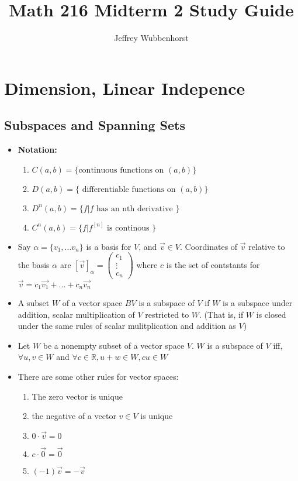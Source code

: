 \documentclass[10pt,letterpaper]{article}
\author{Jeffrey Wubbenhorst}
\title{Math 216 Midterm 2 Study Guide }
\begin{document}
\maketitle

\section*{Dimension, Linear Indepence} 
\subsection*{Subspaces and Spanning Sets }%
\begin{itemize}

\item \textbf{Notation: }
\begin{enumerate}
\item $C(a,b)=\{\mbox{continuous functions on } (a,b)\}$
\item $D(a,b)=\{\mbox{ differentiable functions on } (a,b)\}$ 
\item $D^n(a,b)=\{f | f\mbox{ has an nth derivative }\}$ 
\item $C^n(a,b) = \{f|f^{[n]}\mbox{ is continous }\}$
\end{enumerate}

\item Say $\alpha=\{v_1,...v_n\}$ is a basis for $V$, and $\vec{v}\in V$. Coordinates of $\vec{v}$ relative to the basis $\alpha$ are $[\vec{v}]_\alpha=\left(
\begin{array}{c} 
c_1 \\ \vdots \\ c_n
\end{array} \right)
$
where $c$ is the set of contstants for $\vec{v}=c_1\vec{v_1}+...+c_n\vec{v_n}$


\item A subset $W$ of a vector space $BV$ is a subspace of $V$ if $W$ is a subspace under addition, scalar multiplication of $V$ restricted to  $W$. (That is, if $W$ is closed under the same rules of scalar mulitplication and addition as $V$)

\item Let $W$ be a nonempty subset of a vector space $V$. $W$ is a subspace of $V$ iff, $\forall u, v \in W$ and $\forall c \in \mathbb{R}, u + w \in W, cu \in W$

\item There are some other rules for vector spaces: 
\begin{enumerate}
\item The zero vector is unique 
\item the negative of a vector $v\in V$ is unique 
\item $0\cdot \vec{v}=0$
\item $c\cdot \vec{0}=\vec{0}$
\item $(-1)\vec{v}=-\vec{v}$ 
\end{enumerate}
	


\end{itemize}
\end{document}
